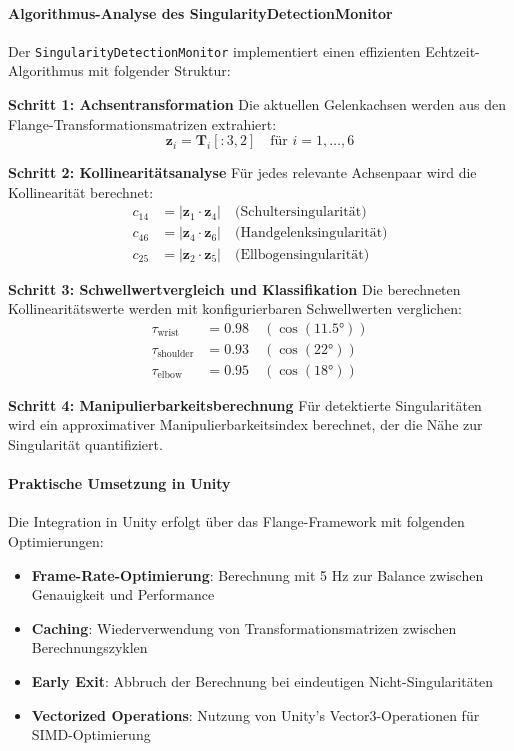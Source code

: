 \paragraph{Algorithmus-Analyse des SingularityDetectionMonitor}
Der \texttt{SingularityDetectionMonitor} implementiert einen effizienten
Echtzeit-Algorithmus mit folgender Struktur:

\textbf{Schritt 1: Achsentransformation}
Die aktuellen Gelenkachsen werden aus den Flange-Transformationsmatrizen extrahiert:
\begin{equation}
    \mathbf{z}_i = \mathbf{T}_i[:3, 2] \quad \text{für } i = 1, \ldots, 6
    \label{eq:axis_extraction}
\end{equation}

\textbf{Schritt 2: Kollinearitätsanalyse}
Für jedes relevante Achsenpaar wird die Kollinearität berechnet:
\begin{align}
    c_{14} & = |\mathbf{z}_1 \cdot \mathbf{z}_4| \quad \text{(Schultersingularität)}   \\
    c_{46} & = |\mathbf{z}_4 \cdot \mathbf{z}_6| \quad \text{(Handgelenksingularität)} \\
    c_{25} & = |\mathbf{z}_2 \cdot \mathbf{z}_5| \quad \text{(Ellbogensingularität)}
\end{align}

\textbf{Schritt 3: Schwellwertvergleich und Klassifikation}
Die berechneten Kollinearitätswerte werden mit konfigurierbaren Schwellwerten verglichen:
\begin{align}
    \tau_{\text{wrist}}    & = 0.98 \quad (\cos(11.5°)) \\
    \tau_{\text{shoulder}} & = 0.93 \quad (\cos(22°))   \\
    \tau_{\text{elbow}}    & = 0.95 \quad (\cos(18°))
\end{align}

\textbf{Schritt 4: Manipulierbarkeitsberechnung}
Für detektierte Singularitäten wird ein approximativer Manipulierbarkeitsindex berechnet, der die Nähe zur Singularität quantifiziert.

\paragraph{Praktische Umsetzung in Unity}
Die Integration in Unity erfolgt über das Flange-Framework mit folgenden
Optimierungen:

\begin{itemize}
    \item \textbf{Frame-Rate-Optimierung}: Berechnung mit 5 Hz zur Balance zwischen Genauigkeit und Performance
    \item \textbf{Caching}: Wiederverwendung von Transformationsmatrizen zwischen Berechnungszyklen
    \item \textbf{Early Exit}: Abbruch der Berechnung bei eindeutigen Nicht-Singularitäten
    \item \textbf{Vectorized Operations}: Nutzung von Unity's Vector3-Operationen für SIMD-Optimierung
\end{itemize}

